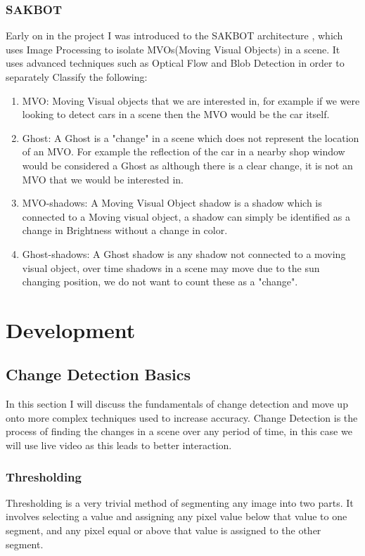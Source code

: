 \documentclass[a4paper]{report}
\begin{document}
\subsection{SAKBOT}
Early on in the project I was introduced to the SAKBOT architecture \cite{SAKBOT}, which uses Image Processing to isolate MVOs(Moving Visual Objects) in a scene. It uses advanced techniques such as Optical Flow and Blob Detection in order to separately Classify the following:
\begin{enumerate}
  \item MVO: Moving Visual objects that we are interested in, for example if we were looking to detect cars in a scene then the MVO would be the car itself.
  \item Ghost: A Ghost is a "change" in a scene which does not represent the location of an MVO. For example the reflection of the car in a nearby shop window would be considered a Ghost as although there is a clear change, it is not an MVO that we would be interested in.
  \item MVO-shadows: A Moving Visual Object shadow is a shadow which is connected to a Moving visual object, a shadow can simply be identified as a change in Brightness without a change in color.
  \item Ghost-shadows: A Ghost shadow is any shadow not connected to a moving visual object, over time shadows in a scene may move due to the sun changing position, we do not want to count these as a "change".
\end{enumerate}

\chapter{Development}
\section{Change Detection Basics}
In this section I will discuss the fundamentals of change detection and move up onto more complex techniques used to increase accuracy. Change Detection is the process of finding the changes in a scene over any period of time, in this case we will use live video as this leads to better interaction.

\subsection{Thresholding}
Thresholding is a very trivial method of segmenting any image into two parts. It involves selecting a value and assigning any pixel value below that value to one segment, and any pixel equal or above that value is assigned to the other segment.
\end{document}
